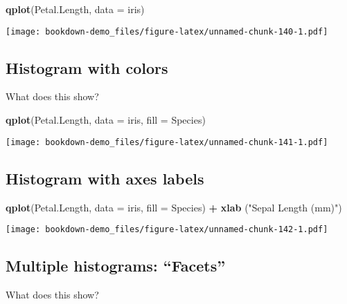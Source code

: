 \documentclass[]{book}
\newenvironment{Shaded}{\begin{snugshade}}{\end{snugshade}}
\newcommand{\KeywordTok}[1]{\textcolor[rgb]{0.13,0.29,0.53}{\textbf{#1}}}
\newcommand{\DataTypeTok}[1]{\textcolor[rgb]{0.13,0.29,0.53}{#1}}
\newcommand{\StringTok}[1]{\textcolor[rgb]{0.31,0.60,0.02}{#1}}
\newcommand{\OperatorTok}[1]{\textcolor[rgb]{0.81,0.36,0.00}{\textbf{#1}}}
\newcommand{\NormalTok}[1]{#1}
\theoremstyle{definition}
\theoremstyle{definition}
\theoremstyle{definition}
\theoremstyle{remark}
\begin{document}
\begin{Shaded}
\begin{Highlighting}[]
\KeywordTok{qplot}\NormalTok{(Petal.Length,}
      \DataTypeTok{data =}\NormalTok{ iris)}
\end{Highlighting}
\end{Shaded}

\texttt{[image: bookdown-demo\_files/figure-latex/unnamed-chunk-140-1.pdf]}

\subsection{Histogram with colors}\label{histogram-with-colors}

What does this show?

\begin{Shaded}
\begin{Highlighting}[]
\KeywordTok{qplot}\NormalTok{(Petal.Length,}
      \DataTypeTok{data =}\NormalTok{ iris,}
      \DataTypeTok{fill =}\NormalTok{ Species)}
\end{Highlighting}
\end{Shaded}

\texttt{[image: bookdown-demo\_files/figure-latex/unnamed-chunk-141-1.pdf]}

\subsection{Histogram with axes
labels}\label{histogram-with-axes-labels}

\begin{Shaded}
\begin{Highlighting}[]
\KeywordTok{qplot}\NormalTok{(Petal.Length,}
      \DataTypeTok{data =}\NormalTok{ iris,}
      \DataTypeTok{fill =}\NormalTok{ Species) }\OperatorTok{+}\StringTok{  }
\StringTok{  }\KeywordTok{xlab}\NormalTok{ (}\StringTok{"Sepal Length (mm)"}\NormalTok{)}
\end{Highlighting}
\end{Shaded}

\texttt{[image: bookdown-demo\_files/figure-latex/unnamed-chunk-142-1.pdf]}

\subsection{\texorpdfstring{Multiple histograms:
``Facets''}{Multiple histograms: Facets}}\label{multiple-histograms-facets}

What does this show?
\end{document}

